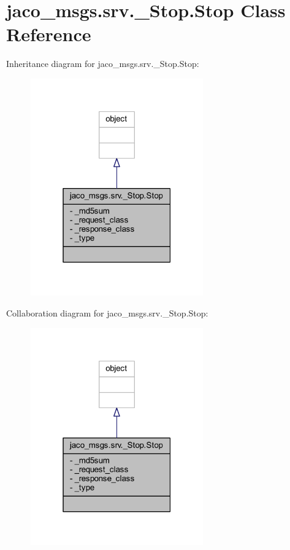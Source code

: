 \hypertarget{classjaco__msgs_1_1srv_1_1__Stop_1_1Stop}{}\section{jaco\+\_\+msgs.\+srv.\+\_\+\+Stop.\+Stop Class Reference}
\label{classjaco__msgs_1_1srv_1_1__Stop_1_1Stop}


Inheritance diagram for jaco\+\_\+msgs.\+srv.\+\_\+\+Stop.\+Stop\+:
\nopagebreak
\begin{figure}[H]
\begin{center}
\leavevmode
\includegraphics[width=211pt]{dd/db7/classjaco__msgs_1_1srv_1_1__Stop_1_1Stop__inherit__graph}
\end{center}
\end{figure}


Collaboration diagram for jaco\+\_\+msgs.\+srv.\+\_\+\+Stop.\+Stop\+:
\nopagebreak
\begin{figure}[H]
\begin{center}
\leavevmode
\includegraphics[width=211pt]{d0/d55/classjaco__msgs_1_1srv_1_1__Stop_1_1Stop__coll__graph}
\end{center}
\end{figure}
